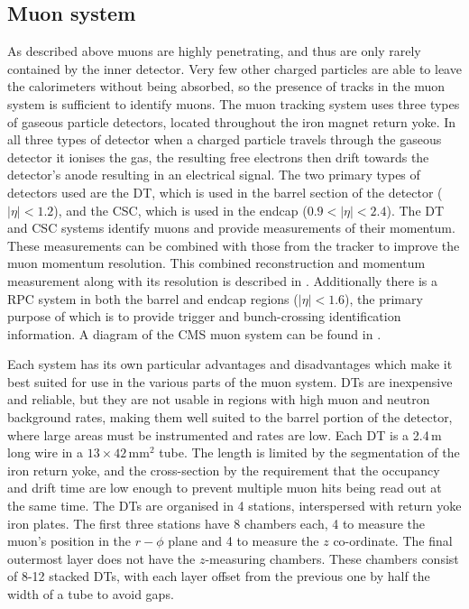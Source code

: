 \subsection{Muon system}
As described above muons are highly penetrating, and thus are only rarely contained by the inner detector. Very few other charged particles are able to leave the calorimeters without being absorbed, so the presence of tracks in the muon system is sufficient to identify muons. The muon tracking system uses three types of gaseous particle detectors, located throughout the iron magnet return yoke. In all three types of detector when a charged particle travels through the gaseous detector it ionises the gas, the resulting free electrons then drift towards the detector's anode resulting in an electrical signal. The two primary types of detectors used are the \ac{DT}, which is used in the barrel section of the detector ($|\eta|<1.2$), and the \ac{CSC}, which is used in the endcap ($0.9<|\eta|<2.4$). The \ac{DT} and \ac{CSC} systems identify muons and provide measurements of their momentum. These measurements can be combined with those from the tracker to improve the muon momentum resolution. This combined reconstruction and momentum measurement along with its resolution is described in . Additionally there is a \ac{RPC} system in both the barrel and endcap regions ($|\eta|<1.6$), the primary purpose of which is to provide trigger and bunch-crossing identification information. A diagram of the CMS muon system can be found in .

Each system has its own particular advantages and disadvantages which make it best suited for use in the various parts of the muon system. \ac{DT}s are inexpensive and reliable, but they are not usable in regions with high muon and neutron background rates, making them well suited to the barrel portion of the detector, where large areas must be instrumented and rates are low. Each \ac{DT} is a 2.4\,m long wire in a $13\times 42$\,mm$^{2}$ tube. The length is limited by the segmentation of the iron return yoke, and the cross-section by the requirement that the occupancy and drift time are low enough to prevent multiple muon hits being read out at the same time. The \ac{DT}s are organised in 4 stations, interspersed with return yoke iron plates. The first three stations have 8 chambers each, 4 to measure the muon's position in the $r-\phi$ plane and 4 to measure the $z$ co-ordinate. The final outermost layer does not have the $z$-measuring chambers. These chambers consist of 8-12 stacked \ac{DT}s, with each layer offset from the previous one by half the width of a tube to avoid gaps.

